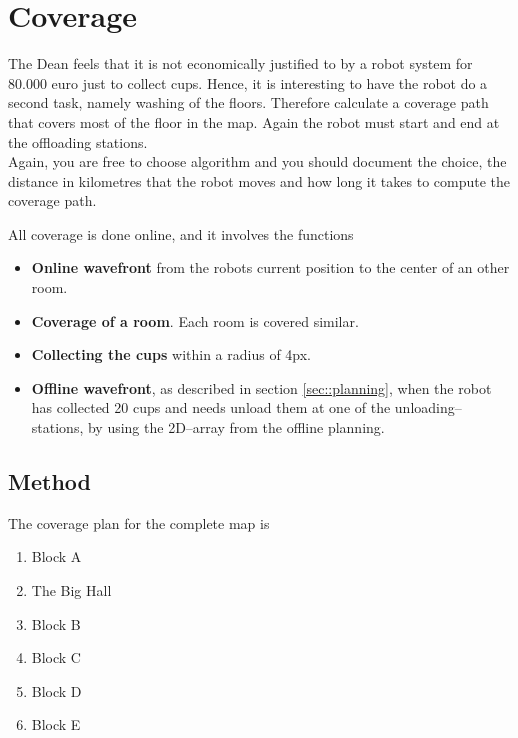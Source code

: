 \section{Coverage}
\label{sec::coverage}
The Dean feels that it is not economically justified to by a robot system for 80.000 euro just to collect cups. Hence, it is interesting to have the robot do a second task, namely washing of the floors. Therefore calculate a coverage path that covers most of the floor in the map. Again the robot must start and end at the offloading stations.\\[0.2cm]
Again, you are free to choose algorithm and you should document the choice, the distance in kilometres that the robot moves and how long it takes to compute the coverage path.

All coverage is done online, and it involves the functions
\begin{itemize}\itemsep-2pt
\item \textbf{Online wavefront} from the robots current position to the center of an other room.
\item \textbf{Coverage of a room}. Each room is covered similar.
\item \textbf{Collecting the cups} within a radius of 4px.
\item \textbf{Offline wavefront}, as described in section \ref{sec::planning}, when the robot has collected 20 cups and needs unload them at one of the unloading--stations, by using the 2D--array from the offline planning. 
\end{itemize}

\subsection{Method}
The coverage plan for the complete map is
\begin{enumerate}\itemsep-2pt
\item Block A
\item The Big Hall
\item Block B
\item Block C
\item Block D
\item Block E
\end{enumerate}


